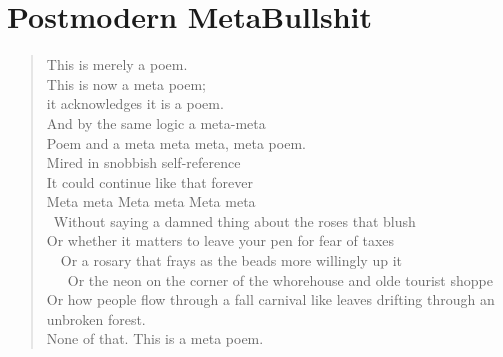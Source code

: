 \documentclass[times,12pt]{book}
\begin{document}
\newpage

\section*{Postmodern MetaBullshit}
\begin{verse}
This is merely a poem.\\
This is now a meta poem;\\
it acknowledges it is a poem.\\
And by the same logic a meta-meta\\
Poem and a meta meta meta, meta poem.\\
Mired in snobbish self-reference\\
It could continue like that forever\\
Meta meta Meta meta Meta meta\\
\quad\ Without saying a damned thing about the roses that blush\\
Or whether it matters to leave your pen for fear of taxes\\
\quad\ \quad\ Or a rosary that frays as the beads more willingly up it\\
\quad\ \quad\ \quad\ Or the neon on the corner of the whorehouse and olde tourist shoppe\\
Or how people flow through a fall carnival like leaves drifting through an unbroken forest.\\[14pt]

None of that. This is a meta poem.
\end{verse}
\newpage
\end{document}
